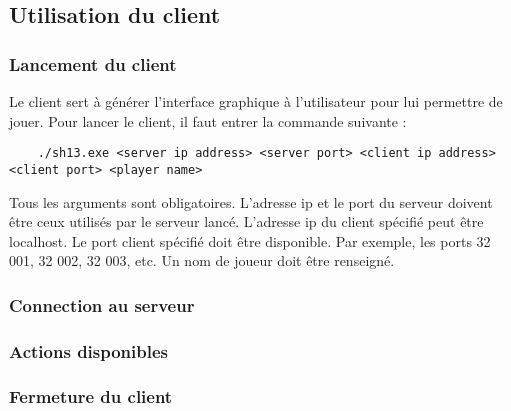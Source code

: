 \subsection{Utilisation du client}

\subsubsection{Lancement du client}

Le client sert à générer l'interface graphique à l'utilisateur pour lui permettre de jouer. Pour lancer le client, il faut entrer la commande suivante :
\begin{verbatim}
    ./sh13.exe <server ip address> <server port> <client ip address> <client port> <player name>
\end{verbatim}
Tous les arguments sont obligatoires. L'adresse ip et le port du serveur doivent être ceux utilisés par le serveur lancé. L'adresse ip du client spécifié peut être localhost. Le port client spécifié doit être disponible. Par exemple, les ports 32 001, 32 002, 32 003, etc. Un nom de joueur doit être renseigné.

\subsubsection{Connection au serveur}

\subsubsection{Actions disponibles}

\subsubsection{Fermeture du client}